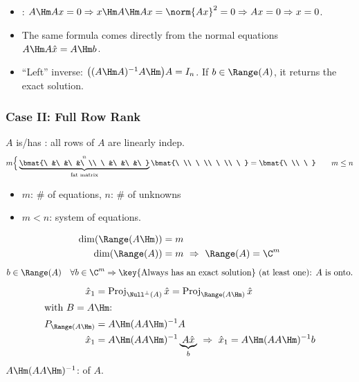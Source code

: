 \begin{insight}
\begin{itemize}[nosep,leftmargin=1.2em]
\item {}: $A\Hm Ax=0\Rightarrow x\Hm A\Hm Ax=\norm{Ax}^2=0\Rightarrow Ax=0\Rightarrow x=0$.
\item The same formula comes directly from the normal equations $A\Hm A\hat x=A\Hm b$.
\item ``Left'' inverse: $\big((A\Hm A)^{-1}A\Hm\big)A=I_n$. If $b\in\Range(A)$, it returns the exact solution.
\end{itemize}
\end{insight}

\subsubsection{Case II: Full Row Rank}
$A$ is/has : all rows of $A$ are linearly indep.
\[
m\Big\{\underbrace{\overset{n}{\bmat{\ &\ &\ &\ \\ \ &\ &\ &\ }}}_{\text{fat matrix}}
\bmat{\ \\ \ \\ \ \\ \ }=\bmat{\ \\ \ } \qquad m\leq n
\]
\begin{itemize}[nosep,leftmargin=1.5em]
\item $m$: \# of equations, \quad $n$: \# of unknowns
\item $m<n$:  system of equations.
\end{itemize}
\begin{align*}
\dim(\Range(A\Hm))&=m\\
\dim(\Range(A))&=m \ \Rightarrow\ \Range(A)=\C^m
\end{align*}
\[
b\in\Range(A)\quad\forall b\in\C^m\Rightarrow\text{\key{Always has an exact solution} (at least one): $A$ is onto.}
\]
\begin{align*}
\hat{x}_1&=\operatorname{Proj}_{\Null^\perp(A)}\hat{x}=\operatorname{Proj}_{\Range(A\Hm)}\hat{x}\\
\intertext{with $B=A\Hm$:}
P_{\Range(A\Hm)}&=A\Hm(AA\Hm)^{-1}A\\
\hat{x}_1&=A\Hm(AA\Hm)^{-1}\underbrace{A\hat{x}}_{b}\ \Rightarrow\ \hat{x}_1=A\Hm(AA\Hm)^{-1}b
\end{align*}
$A\Hm(AA\Hm)^{-1}$:  of $A$.

